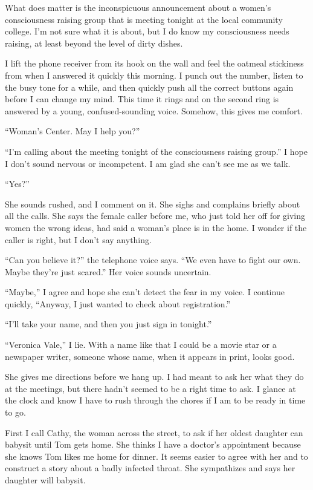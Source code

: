 \documentclass[
]{article}
\begin{document}
What does matter is the inconspicuous announcement about a women's
consciousness raising group that is meeting tonight at the local
community college. I'm not sure what it is about, but I do know my
consciousness needs raising, at least beyond the level of dirty dishes.

I lift the phone receiver from its hook on the wall and feel the oatmeal
stickiness from when I answered it quickly this morning. I punch out the
number, listen to the busy tone for a while, and then quickly push all
the correct buttons again before I can change my mind. This time it
rings and on the second ring is answered by a young, confused-sounding
voice. Somehow, this gives me comfort.

``Woman's Center. May I help you?''

``I'm calling about the meeting tonight of the consciousness raising
group.'' I hope I don't sound nervous or incompetent. I am glad she
can't see me as we talk.

``Yes?''

She sounds rushed, and I comment on it. She sighs and complains briefly
about all the calls. She says the female caller before me, who just told
her off for giving women the wrong ideas, had said a woman's place is in
the home. I wonder if the caller is right, but I don't say anything.

``Can you believe it?'' the telephone voice says. ``We even have to
fight our own. Maybe they're just scared.'' Her voice sounds uncertain.

``Maybe,'' I agree and hope she can't detect the fear in my voice. I
continue quickly, ``Anyway, I just wanted to check about registration.''

``I'll take your name, and then you just sign in tonight.''

``Veronica Vale,'' I lie. With a name like that I could be a movie star
or a newspaper writer, someone whose name, when it appears in print,
looks good.

She gives me directions before we hang up. I had meant to ask her what
they do at the meet­ings, but there hadn't seemed to be a right time to
ask. I glance at the clock and know I have to rush through the chores if
I am to be ready in time to go.

First I call Cathy, the woman across the street, to ask if her oldest
daughter can babysit until Tom gets home. She thinks I have a doctor's
appointment because she knows Tom likes me home for dinner. It seems
easier to agree with her and to construct a story about a badly infected
throat. She sympathizes and says her daughter will babysit.
\end{document}
